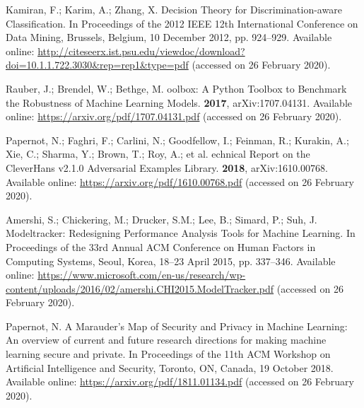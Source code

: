 \documentclass[information,article,accept,moreauthors,pdftex]{Definitions/mdpi}
\begin{document}
{\begin{thebibliography}{999}
Kamiran, F.; Karim, A.; Zhang, X.
\newblock Decision {T}heory for {D}iscrimination-aware {C}lassification.
\newblock  In Proceedings of the 2012 IEEE 12th International Conference on Data Mining, Brussels, Belgium, 10 December 2012, pp. 924--929.
\newblock Available online: 
  \url{http://citeseerx.ist.psu.edu/viewdoc/download?doi=10.1.1.722.3030&rep=rep1&type=pdf} (accessed on 26 February 2020).

Rauber, J.; Brendel, W.; Bethge, M.
oolbox: {A} {P}ython {T}oolbox to {B}enchmark the {R}obustness of
  {M}achine {L}earning {M}odels.
 {\bf 2017}, arXiv:1707.04131.
\newblock Available online: \url{https://arxiv.org/pdf/1707.04131.pdf} (accessed on 26 February 2020).

Papernot, N.; Faghri, F.; Carlini, N.; Goodfellow, I.; Feinman, R.; Kurakin,
  A.; Xie, C.; Sharma, Y.; Brown, T.; Roy, A.; et al.
echnical {R}eport on the {C}leverHans v2.1.0 {A}dversarial
  {E}xamples {L}ibrary.
 {\bf 2018}, arXiv:1610.00768.
\newblock Available online: \url{https://arxiv.org/pdf/1610.00768.pdf} (accessed on 26 February 2020).

Amershi, S.; Chickering, M.; Drucker, S.M.; Lee, B.; Simard, P.; Suh, J.
\newblock Modeltracker: {R}edesigning {P}erformance {A}nalysis {T}ools for
  {M}achine {L}earning.
\newblock  In Proceedings of the 33rd Annual ACM Conference on Human Factors in
  Computing Systems, Seoul, Korea, 18--23 April 2015, pp. 337--346. %
\newblock Available online: 
  \url{https://www.microsoft.com/en-us/research/wp-content/uploads/2016/02/amershi.CHI2015.ModelTracker.pdf} (accessed on 26 February 2020).

Papernot, N.
\newblock A {M}arauder's {M}ap of {S}ecurity and {P}rivacy in {M}achine
  {L}earning: {A}n overview of current and future research directions for
  making machine learning secure and private.
\newblock  In Proceedings of the 11th ACM Workshop on Artificial Intelligence and
  Security, Toronto, ON, Canada, 19 October 2018. %
\newblock Available online: \url{https://arxiv.org/pdf/1811.01134.pdf} (accessed on 26 February 2020).


\end{thebibliography}}
\end{document}
